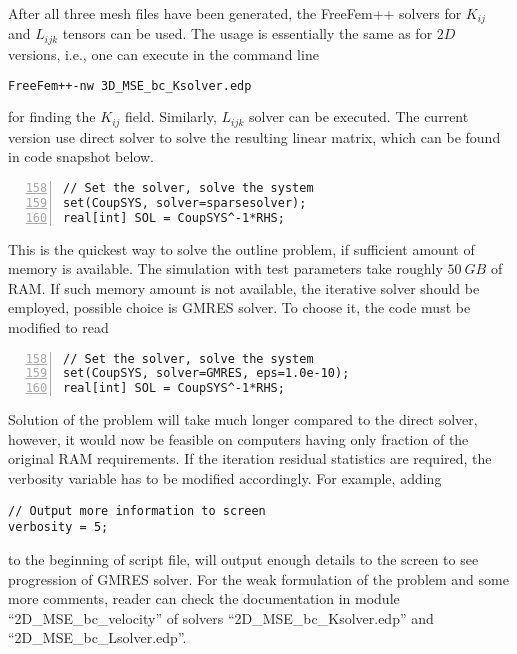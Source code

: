 \documentclass[12pt,a4paper]{article}
\begin{document}
After all three mesh files have been generated, the FreeFem++ solvers for $K_{ij}$ and $L_{ijk}$ tensors can be used. The usage is essentially the same as for $2D$ versions, i.e., one can execute in the command line
\begin{lstlisting}[language=tex]
FreeFem++-nw 3D_MSE_bc_Ksolver.edp
\end{lstlisting}
for finding the $K_{ij}$ field. Similarly, $L_{ijk}$ solver can be executed. The current version use direct solver to solve the resulting linear matrix, which can be found in code snapshot below.
\begin{lstlisting}[numbers=left,firstnumber=158]
// Set the solver, solve the system
set(CoupSYS, solver=sparsesolver);
real[int] SOL = CoupSYS^-1*RHS;
\end{lstlisting}
This is the quickest way to solve the outline problem, if sufficient amount of memory is available. The simulation with test parameters take roughly $50\ GB$ of RAM. If such memory amount is not available, the iterative solver should be employed, possible choice is GMRES solver. To choose it, the code must be modified to read
\begin{lstlisting}[numbers=left,firstnumber=158]
// Set the solver, solve the system
set(CoupSYS, solver=GMRES, eps=1.0e-10);
real[int] SOL = CoupSYS^-1*RHS;
\end{lstlisting}
Solution of the problem will take much longer compared to the direct solver, however, it would now be feasible on computers having only fraction of the original RAM requirements. If the iteration residual statistics are required, the verbosity variable has to be modified accordingly. For example, adding
\begin{lstlisting}
// Output more information to screen
verbosity = 5;
\end{lstlisting}
to the beginning of script file, will output enough details to the screen to see progression of GMRES solver. For the weak formulation of the problem and some more comments, reader can check the documentation in module ``2D\_MSE\_bc\_velocity'' of solvers ``2D\_MSE\_bc\_Ksolver.edp'' and ``2D\_MSE\_bc\_Lsolver.edp''.
\end{document}

